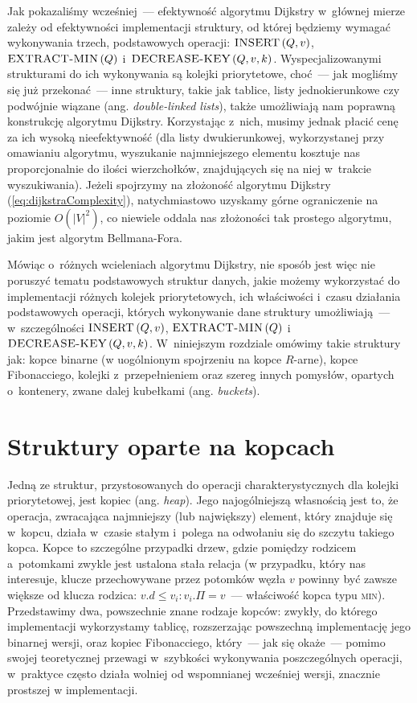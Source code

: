 Jak pokazaliśmy wcześniej~--- efektywność algorytmu Dijkstry w~głównej mierze zależy od efektywności implementacji struktury, od której będziemy wymagać wykonywania trzech, podstawowych operacji: $\textrm{\textsc{INSERT}} \left( Q, v \right)$, $\textrm{\textsc{EXTRACT-MIN}} \left( Q \right)$ i~$\textrm{\textsc{DECREASE-KEY}} \left( Q, v, k \right)$. Wyspecjalizowanymi strukturami do ich wykonywania są kolejki priorytetowe, choć~--- jak mogliśmy się już przekonać~--- inne struktury, takie jak tablice, listy jednokierunkowe czy podwójnie wiązane (ang. \textit{double-linked lists}), także umożliwiają nam poprawną konstrukcję algorytmu Dijkstry. Korzystając z~nich, musimy jednak płacić cenę za ich wysoką nieefektywność (dla listy dwukierunkowej, wykorzystanej przy omawianiu algorytmu, wyszukanie najmniejszego elementu kosztuje nas proporcjonalnie do ilości wierzchołków, znajdujących się na niej w~trakcie wyszukiwania). Jeżeli spojrzymy na złożoność algorytmu Dijkstry (\ref{eq:dijkstraComplexity}), natychmiastowo uzyskamy górne ograniczenie na poziomie $ O \left( \left| V \right| ^{2} \right)$, co niewiele oddala nas złożoności tak prostego algorytmu, jakim jest algorytm Bellmana-Fora.


Mówiąc o~różnych wcieleniach algorytmu Dijkstry, nie sposób jest więc nie poruszyć tematu podstawowych struktur danych, jakie możemy wykorzystać do implementacji różnych kolejek priorytetowych, ich właściwości i~czasu działania podstawowych operacji, których wykonywanie dane struktury umożliwiają~--- w~szczególności $\textrm{\textsc{INSERT}} \left( Q, v \right)$, $\textrm{\textsc{EXTRACT-MIN}} \left( Q \right)$ i~$\textrm{\textsc{DECREASE-KEY}} \left( Q, v, k \right)$. W~niniejszym rozdziale omówimy takie struktury jak: kopce binarne (w uogólnionym spojrzeniu na kopce $R$-arne), kopce Fibonacciego, kolejki z~przepełnieniem oraz szereg innych pomysłów, opartych o~kontenery, zwane dalej kubełkami (ang. \textit{buckets}).

\section{Struktury oparte na kopcach}

Jedną ze struktur, przystosowanych do operacji charakterystycznych dla kolejki priorytetowej, jest kopiec (ang. \textit{heap}). Jego najogólniejszą własnością jest to, że operacja, zwracająca najmniejszy (lub największy) element, który znajduje się w~kopcu, działa w~czasie stałym i~polega na odwołaniu się do szczytu takiego kopca. Kopce to szczególne przypadki drzew, gdzie pomiędzy rodzicem a~potomkami zwykle jest ustalona stała relacja (w przypadku, który nas interesuje, klucze przechowywane przez potomków węzła $v$ powinny być zawsze większe od klucza rodzica: $v.d \leqslant v_{i} : v_{i}.\Pi = v$~--- właściwość kopca typu \textsc{min}). Przedstawimy dwa, powszechnie znane rodzaje kopców: zwykły, do którego implementacji wykorzystamy tablicę, rozszerzając powszechną implementację jego binarnej wersji, oraz kopiec Fibonacciego, który~--- jak się okaże~--- pomimo swojej teoretycznej przewagi w~szybkości wykonywania poszczególnych operacji, w~praktyce często działa wolniej od wspomnianej wcześniej wersji, znacznie prostszej w implementacji.

